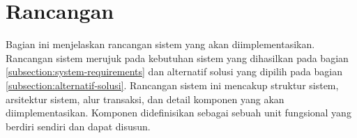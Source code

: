 \section{Rancangan}
\label{sec:rancangan}

Bagian ini menjelaskan rancangan sistem yang akan diimplementasikan. Rancangan sistem merujuk pada kebutuhan sistem yang dihasilkan pada bagian \ref{subsection:system-requirements} dan alternatif solusi yang dipilih pada bagian \ref{subsection:alternatif-solusi}. Rancangan sistem ini mencakup struktur sistem, arsitektur sistem, alur transaksi, dan detail komponen yang akan diimplementasikan. Komponen didefinisikan sebagai sebuah unit fungsional yang berdiri sendiri dan dapat disusun.






